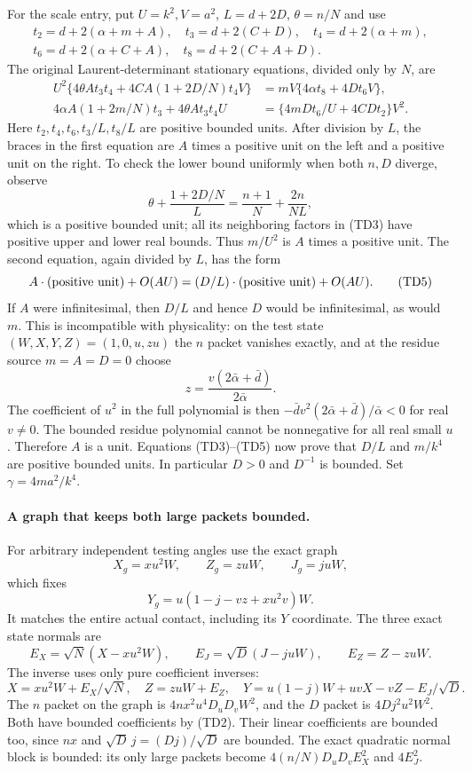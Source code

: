 For the scale entry, put $U=k^2,V=a^2$, $L=d+2D$,
$\theta=n/N$ and use
\[
\begin{gathered}
t_2=d+2(\alpha+m+A),\quad t_3=d+2(C+D),\quad
 t_4=d+2(\alpha+m),\\
t_6=d+2(\alpha+C+A),\quad t_8=d+2(C+A+D).
\end{gathered}
\]
The original Laurent-determinant stationary equations, divided only
by $N$, are
\[
\begin{split}
U^2\{4\theta A t_3t_4+4CA(1+2D/N)t_4V\}
 &=mV\{4\alpha t_8+4Dt_6V\},\\
4\alpha A(1+2m/N)t_3+4\theta A t_3t_4U
 &=\{4mDt_6/U+4CDt_2\}V^2.
\end{split}                       \tag{TD3}
\]
Here $t_2,t_4,t_6,t_3/L,t_8/L$ are positive bounded units.
After division by $L$, the braces in the first equation are
$A$ times a positive unit on the left and a positive unit on the
right. To check the lower bound uniformly when both $n,D$ diverge,
observe
\[
 \theta+\frac{1+2D/N}{L}
 =\frac{n+1}{N}+\frac{2n}{NL},                    \tag{TD4}
\]
which is a positive bounded unit; all its neighboring factors in
(TD3) have positive upper and lower real bounds. Thus
$m/U^2$ is $A$ times a positive unit. The second equation, again
divided by $L$, has the form
\[
 A\cdot(\hbox{positive unit})+O(AU)
    =(D/L)\cdot(\hbox{positive unit})+O(AU).       \tag{TD5}
\]
If $A$ were infinitesimal, then $D/L$ and hence $D$ would be
infinitesimal, as would $m$. This is incompatible with physicality:
on the test state $(W,X,Y,Z)=(1,0,u,zu)$ the $n$ packet vanishes
exactly, and at the residue source $m=A=D=0$ choose
\[
 z=\frac{v(2\bar\alpha+\bar d)}{2\bar\alpha}.
\]
The coefficient of $u^2$ in the full polynomial is then
$-\bar d v^2(2\bar\alpha+\bar d)/\bar\alpha<0$ for real $v\ne0$.
The bounded residue polynomial cannot be nonnegative for all real
small $u$. Therefore $A$ is a unit. Equations (TD3)--(TD5) now prove
that $D/L$ and $m/k^4$ are positive bounded units. In particular
$D>0$ and $D^{-1}$ is bounded. Set $\gamma=4ma^2/k^4$.

\paragraph{A graph that keeps both large packets bounded.}
For arbitrary independent testing angles use the exact graph
\[
 X_g=xu^2W,\qquad Z_g=zuW,\qquad J_g=juW,
\]
which fixes
\[
 Y_g=u(1-j-vz+xu^2v)W.                            \tag{TD6}
\]
It matches the entire actual contact, including its $Y$ coordinate.
The three exact state normals are
\[
 E_X=\sqrt N(X-xu^2W),\qquad
 E_J=\sqrt D(J-juW),\qquad E_Z=Z-zuW.             \tag{TD7}
\]
The inverse uses only pure coefficient inverses:
\[
 X=xu^2W+E_X/\sqrt N,\quad Z=zuW+E_Z,\quad
 Y=u(1-j)W+uvX-vZ-E_J/\sqrt D.                   \tag{TD8}
\]
The $n$ packet on the graph is
$4nx^2u^4D_uD_vW^2$, and the $D$ packet is
$4Dj^2u^2W^2$. Both have bounded coefficients by (TD2).
Their linear coefficients are bounded too, since $nx$ and
$\sqrt D\,j=(Dj)/\sqrt D$ are bounded. The exact quadratic
normal block is bounded: its only large packets become
$4(n/N)D_uD_vE_X^2$ and $4E_J^2$.

